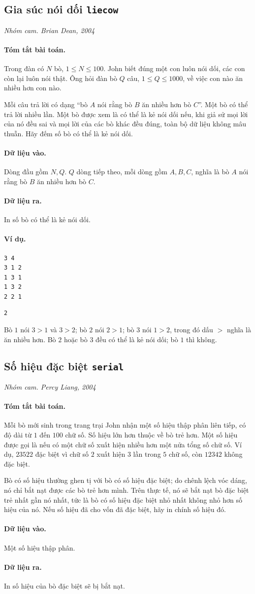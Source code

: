 \documentclass[11pt]{article}
\newcommand{\problem}[4]{%
  \subsection[#1 (#2)]{#1 \hfill {\normalsize\texttt{#2}}}%
  \noindent\textit{#3. #4}\par\smallskip
}
\newcommand{\iosec}[1]{\paragraph{#1}}
\begin{document}
\problem{Gia súc nói dối}{liecow}{Nhóm cam}{Brian Dean, 2004}

\iosec{Tóm tắt bài toán.}
Trong đàn có \(N\) bò, \(1\le N\le 100\). John biết đúng một con luôn nói dối,
các con còn lại luôn nói thật. Ông hỏi đàn bò \(Q\) câu, \(1\le Q\le 1000\),
về việc con nào ăn nhiều hơn con nào.

Mỗi câu trả lời có dạng ``bò \(A\) nói rằng bò \(B\) ăn nhiều hơn bò \(C\)''.
Một bò có thể trả lời nhiều lần. Một bò được xem là có thể là kẻ nói dối nếu,
khi giả sử mọi lời của nó đều sai và mọi lời của các bò khác đều đúng, toàn bộ
dữ liệu không mâu thuẫn. Hãy đếm số bò có thể là kẻ nói dối.

\iosec{Dữ liệu vào.}
Dòng đầu gồm \(N,Q\). \(Q\) dòng tiếp theo, mỗi dòng gồm \(A,B,C\), nghĩa là
bò \(A\) nói rằng bò \(B\) ăn nhiều hơn bò \(C\).

\iosec{Dữ liệu ra.}
In số bò có thể là kẻ nói dối.

\iosec{Ví dụ.}
\begin{verbatim}
3 4
3 1 2
1 3 1
1 3 2
2 2 1
\end{verbatim}

\begin{verbatim}
2
\end{verbatim}

Bò \(1\) nói \(3>1\) và \(3>2\); bò \(2\) nói \(2>1\); bò \(3\) nói
\(1>2\), trong đó dấu \(>\) nghĩa là ăn nhiều hơn. Bò \(2\) hoặc bò \(3\) đều
có thể là kẻ nói dối; bò \(1\) thì không.

\problem{Số hiệu đặc biệt}{serial}{Nhóm cam}{Percy Liang, 2004}

\iosec{Tóm tắt bài toán.}
Mỗi bò mới sinh trong trang trại John nhận một số hiệu thập phân liên tiếp, có
độ dài từ \(1\) đến \(100\) chữ số. Số hiệu lớn hơn thuộc về bò trẻ hơn. Một số
hiệu được gọi là  nếu có một chữ số xuất hiện nhiều hơn một nửa
tổng số chữ số. Ví dụ, \(23522\) đặc biệt vì chữ số \(2\) xuất hiện \(3\) lần
trong \(5\) chữ số, còn \(12342\) không đặc biệt.

Bò có số hiệu thường ghen tị với bò có số hiệu đặc biệt; do chênh lệch vóc
dáng, nó chỉ bắt nạt được các bò trẻ hơn mình. Trên thực tế, nó sẽ bắt nạt bò
đặc biệt trẻ nhất gần nó nhất, tức là bò có số hiệu đặc biệt nhỏ nhất không
nhỏ hơn số hiệu của nó. Nếu số hiệu đã cho vốn đã đặc biệt, hãy in chính số
hiệu đó.

\iosec{Dữ liệu vào.}
Một số hiệu thập phân.

\iosec{Dữ liệu ra.}
In số hiệu của bò đặc biệt sẽ bị bắt nạt.
\end{document}
